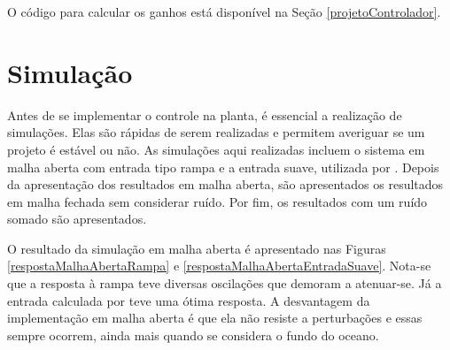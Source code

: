 O código para calcular os ganhos está disponível na Seção \ref{projetoControlador}.

\section{Simulação}

 Antes de se implementar o controle na planta, é essencial a realização de simulações. Elas são rápidas de serem realizadas e permitem averiguar se um projeto é estável ou não. As simulações aqui realizadas incluem o sistema em malha aberta com entrada tipo rampa e a entrada suave, utilizada por \cite{rafaelMestrado}. Depois da apresentação dos resultados em malha aberta, são apresentados os resultados em malha fechada sem considerar ruído. Por fim, os resultados com um ruído somado são apresentados.
 
 O resultado da simulação em malha aberta é apresentado nas Figuras \ref{respostaMalhaAbertaRampa} e \ref{respostaMalhaAbertaEntradaSuave}. Nota-se que a resposta à rampa teve diversas oscilações que demoram a atenuar-se. Já a entrada calculada por \cite{rafaelMestrado} teve uma ótima resposta. A desvantagem da implementação em malha aberta é que ela não resiste a perturbações e essas sempre ocorrem, ainda mais quando se considera o fundo do oceano.
 
